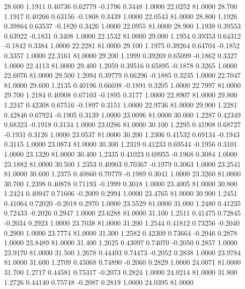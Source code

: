   28.600   1.1911   0.40736   0.62779  -0.1796   0.3448   1.0000  22.0252  81.0000
  28.700   1.1917   0.40266   0.63156  -0.1808   0.3439   1.0000  22.0543  81.0000
  28.800   1.1926   0.39864   0.63537  -0.1820   0.3426   1.0000  22.0955  81.0000
  28.900   1.1938   0.39553   0.63922  -0.1831   0.3408   1.0000  22.1532  81.0000
  29.000   1.1954   0.39353   0.64312  -0.1842   0.3384   1.0000  22.2281  81.0000
  29.100   1.1975   0.39264   0.64704  -0.1852   0.3357   1.0000  22.3161  81.0000
  29.200   1.1999   0.39269   0.65099  -0.1862   0.3327   1.0000  22.4113  81.0000
  29.400   1.2059   0.39516   0.65895  -0.1878   0.3265   1.0000  22.6076  81.0000
  29.500   1.2094   0.39779   0.66296  -0.1885   0.3235   1.0000  22.7047  81.0000
  29.600   1.2135   0.40196   0.66698  -0.1891   0.3205   1.0000  22.7997  81.0000
  29.700   1.2184   0.40908   0.67103  -0.1895   0.3177   1.0000  22.8907  81.0000
  29.800   1.2247   0.42308   0.67516  -0.1897   0.3151   1.0000  22.9736  81.0000
  29.900   1.2281   0.42846   0.67924  -0.1905   0.3139   1.0000  23.0096  81.0000
  30.000   1.2287   0.42349   0.68323  -0.1918   0.3134   1.0000  23.0286  81.0000
  30.100   1.2295   0.41908   0.68727  -0.1931   0.3126   1.0000  23.0537  81.0000
  30.200   1.2306   0.41532   0.69134  -0.1943   0.3115   1.0000  23.0874  81.0000
  30.300   1.2319   0.41233   0.69544  -0.1956   0.3101   1.0000  23.1320  81.0000
  30.400   1.2335   0.41023   0.69955  -0.1968   0.3084   1.0000  23.1882  81.0000
  30.500   1.2353   0.40903   0.70367  -0.1979   0.3063   1.0000  23.2541  81.0000
  30.600   1.2375   0.40860   0.70779  -0.1989   0.3041   1.0000  23.3260  81.0000
  30.700   1.2398   0.40878   0.71193  -0.1999   0.3018   1.0000  23.4005  81.0000
  30.800   1.2424   0.40947   0.71606  -0.2009   0.2994   1.0000  23.4765  81.0000
  30.900   1.2451   0.41064   0.72020  -0.2018   0.2970   1.0000  23.5529  81.0000
  31.000   1.2480   0.41235   0.72433  -0.2026   0.2947   1.0000  23.6288  81.0000
  31.100   1.2511   0.41475   0.72845  -0.2034   0.2923   1.0000  23.7038  81.0000
  31.200   1.2544   0.41812   0.73256  -0.2040   0.2900   1.0000  23.7774  81.0000
  31.300   1.2582   0.42309   0.73664  -0.2046   0.2878   1.0000  23.8489  81.0000
  31.400   1.2625   0.43097   0.74070  -0.2050   0.2857   1.0000  23.9170  81.0000
  31.500   1.2678   0.44493   0.74473  -0.2052   0.2838   1.0000  23.9784  81.0000
  31.600   1.2709   0.45068   0.74890  -0.2060   0.2829   1.0000  24.0071  81.0000
  31.700   1.2717   0.44581   0.75317  -0.2073   0.2824   1.0000  24.0214  81.0000
  31.800   1.2726   0.44140   0.75748  -0.2087   0.2819   1.0000  24.0395  81.0000

